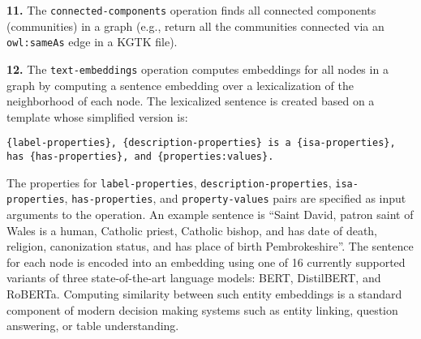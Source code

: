 \documentclass[runningheads]{llncs}
\newcommand{\kibitz}[2]{%
{\color{#1}#2}{}%
}
\newcommand{\DG}[1]{\kibitz{red}{[DG: #1]}} %
\begin{document}




\textbf{11.} The \texttt{connected-components} operation finds all connected components (communities) in a graph (e.g., return all the communities connected via an \texttt{owl:sameAs} edge in a KGTK file). 





\textbf{12. } The \texttt{text-embeddings} operation computes embeddings for all nodes in a graph by computing a sentence embedding over a lexicalization of the neighborhood of each node. The lexicalized sentence is created based on a template whose simplified version is:
{\footnotesize
\begin{verbatim}
{label-properties}, {description-properties} is a {isa-properties},
has {has-properties}, and {properties:values}.
\end{verbatim}
}

\sloppy
The properties for \texttt{label-properties}, \texttt{description-properties}, \texttt{isa-properties}, \texttt{has-properties}, and \texttt{property-values} pairs are specified as input arguments to the operation. An example sentence is ``Saint David, patron saint of Wales is a human, Catholic priest, Catholic bishop, and has date of death, religion, canonization status, and has place of birth Pembrokeshire''. The sentence for each node is encoded into an embedding using one of 16 currently supported variants of three state-of-the-art language models: BERT, DistilBERT, and RoBERTa. Computing similarity between such entity embeddings is a standard component of modern decision making systems such as entity linking, question answering, or table understanding.%
\end{document}
